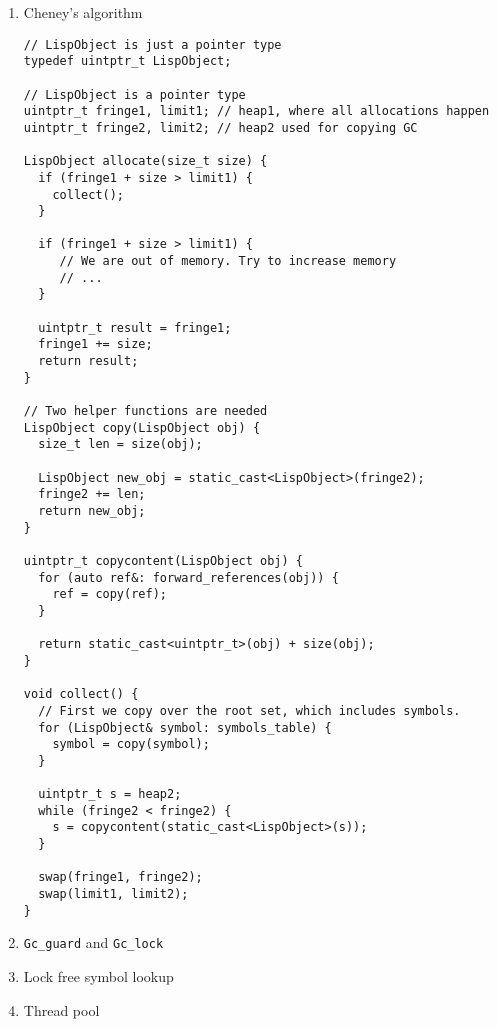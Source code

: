 \begin{enumerate}
\item Cheney's algorithm
\label{sec:cheneycode}

\begin{verbatim}
// LispObject is just a pointer type
typedef uintptr_t LispObject;

// LispObject is a pointer type
uintptr_t fringe1, limit1; // heap1, where all allocations happen
uintptr_t fringe2, limit2; // heap2 used for copying GC

LispObject allocate(size_t size) {
  if (fringe1 + size > limit1) {
    collect();
  }

  if (fringe1 + size > limit1) {
     // We are out of memory. Try to increase memory
     // ...
  }

  uintptr_t result = fringe1;
  fringe1 += size;
  return result;
}

// Two helper functions are needed
LispObject copy(LispObject obj) {
  size_t len = size(obj);

  LispObject new_obj = static_cast<LispObject>(fringe2);
  fringe2 += len;
  return new_obj;
}

uintptr_t copycontent(LispObject obj) {
  for (auto ref&: forward_references(obj)) {
    ref = copy(ref);
  }

  return static_cast<uintptr_t>(obj) + size(obj);
}

void collect() {
  // First we copy over the root set, which includes symbols.
  for (LispObject& symbol: symbols_table) {
    symbol = copy(symbol);
  }

  uintptr_t s = heap2;
  while (fringe2 < fringe2) {
    s = copycontent(static_cast<LispObject>(s));
  }

  swap(fringe1, fringe2);
  swap(limit1, limit2);
}
\end{verbatim}

\item \texttt{Gc\_guard} and \texttt{Gc\_lock}
\label{sec:orgc9a1d3d}
\item Lock free symbol lookup
\label{sec:org0a6de58}
\item Thread pool
\label{sec:org504fab0}
\end{enumerate}